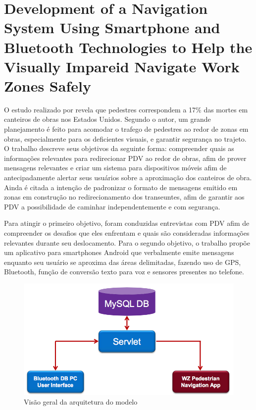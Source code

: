 \documentclass[english,brazilian]{UNISINOSmonografia}
\begin{document}
	\section{Development of a Navigation System Using Smartphone and Bluetooth Technologies to Help the Visually Impareid Navigate Work Zones Safely} 

O estudo realizado por  revela que pedestres correspondem a 17\% das mortes em canteiros de obras nos Estados Unidos. Segundo o autor, um grande planejamento é feito para acomodar o trafego de pedestres ao redor de zonas em obras, especialmente para os deficientes visuais, e garantir segurança no trajeto. O trabalho descreve seus objetivos da seguinte forma: compreender quais as informações relevantes para redirecionar PDV ao redor de obras, afim de prover mensagens relevantes e criar um sistema para dispositivos móveis afim de antecipadamente alertar seus usuários sobre a aproximação dos canteiros de obra. Ainda é citada a intenção de padronizar o formato de mensagens emitido em zonas em construção no redirecionamento dos transeuntes, afim de garantir aos PDV a possibilidade de caminhar independentemente e com segurança.

Para atingir o primeiro objetivo, foram conduzidas entrevistas com PDV afim de compreender os desafios que eles enfrentam e quais são consideradas informações relevantes durante seu deslocamento. Para o segundo objetivo, o trabalho propõe um aplicativo para smartphones Android que verbalmente emite mensagens enquanto seu usuário se aproxima das áreas delimitadas, fazendo uso de GPS, Bluetooth, função de conversão texto para voz e sensores presentes no telefone. 

\begin{figure}
	\caption{Visão geral da arquitetura do modelo}
	\label{fig:visaoGeralWorkzones}
	\centering%
	\begin{minipage}{.6\textwidth}
		\includegraphics[width=\textwidth]{imgs/workzoneArquitetura}
		\end{minipage}
\end{figure}
\end{document}

